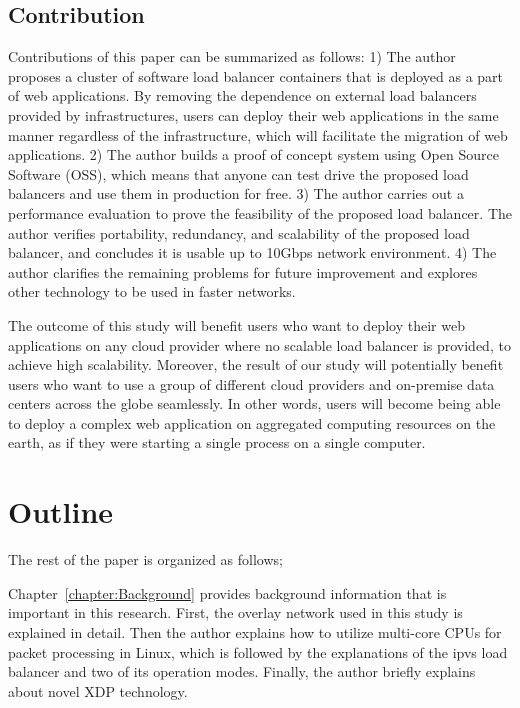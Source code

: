 \subsection{Contribution}


Contributions of this paper can be summarized as follows:
1) The author proposes a cluster of software load balancer containers that is deployed as a part of web applications.
By removing the dependence on external load balancers provided by infrastructures, users can deploy their web applications in the same manner regardless of the infrastructure, which will facilitate the migration of web applications.
2) The author builds a proof of concept system using Open Source Software (OSS), which means that anyone can test drive the proposed load balancers and use them in production for free.
3) The author carries out a performance evaluation to prove the feasibility of the proposed load balancer.
The author verifies portability, redundancy, and scalability of the proposed load balancer, and concludes it is usable up to 10Gbps network environment.
4) The author clarifies the remaining problems for future improvement and explores other technology to be used in faster networks.

The outcome of this study will benefit users who want to deploy their web applications on any cloud provider where no scalable load balancer is provided, to achieve high scalability.
Moreover, the result of our study will potentially benefit users who want to use a group of different cloud providers and on-premise data centers across the globe seamlessly.
In other words, users will become being able to deploy a complex web application on aggregated computing resources on the earth, as if they were starting a single process on a single computer.

\section{Outline}


The rest of the paper is organized as follows;

Chapter~\ref{chapter:Background} provides background information that is important in this research.
First, the overlay network used in this study is explained in detail.
Then the author explains how to utilize multi-core CPUs for packet processing in Linux,
which is followed by the explanations of the ipvs load balancer and two of its operation modes.
Finally, the author briefly explains about novel XDP technology.

